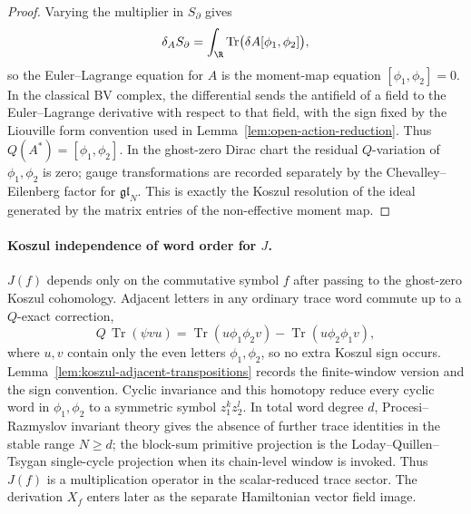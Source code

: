 \documentclass[11pt]{memoir}
\begin{document}
\begin{proof}
  Varying the multiplier in \(S_\partial\) gives
  \[
    \delta_A S_\partial
      =
      \int_\R\operatorname{Tr}\bigl(\delta A[\phi_1,\phi_2]\bigr),
  \]
  so the Euler--Lagrange equation for \(A\) is the moment-map equation
  \([\phi_1,\phi_2]=0\).  In the classical BV complex, the differential
  sends the antifield of a field to the Euler--Lagrange derivative with
  respect to that field, with the sign fixed by the Liouville form
  convention used in Lemma~\ref{lem:open-action-reduction}.  Thus
  \(Q(A^*)=[\phi_1,\phi_2]\).  In the ghost-zero Dirac chart the
  residual \(Q\)-variation of \(\phi_1,\phi_2\) is zero; gauge
  transformations are recorded separately by the
  Chevalley--Eilenberg factor for \(\mathfrak{gl}_N\).  This is exactly
  the Koszul resolution of the ideal generated by the matrix entries of
  the non-effective moment map.
\end{proof}

\paragraph{\texorpdfstring{Koszul independence of word order for \(J\).}{Koszul independence of word order for J}}
\(J(f)\) depends only on the commutative symbol \(f\) after passing to
the ghost-zero Koszul cohomology.  Adjacent letters in any ordinary
trace word commute up to a \(Q\)-exact correction,
\[
  Q\,\operatorname{Tr}(\psi vu)
  =
  \operatorname{Tr}(u\phi_1\phi_2v)
  -\operatorname{Tr}(u\phi_2\phi_1v),
\]
where \(u,v\) contain only the even letters \(\phi_1,\phi_2\), so no
extra Koszul sign occurs.  Lemma~\ref{lem:koszul-adjacent-transpositions}
records the finite-window version and the sign convention.  Cyclic
invariance and this homotopy reduce every cyclic word in
\(\phi_1,\phi_2\) to a symmetric symbol \(z_1^kz_2^l\).  In total word
degree \(d\), Procesi--Razmyslov invariant theory gives the absence of
further trace identities in the stable range \(N\geq d\); the block-sum
primitive projection is the Loday--Quillen--Tsygan single-cycle
projection when its chain-level window is invoked.  Thus \(J(f)\) is a
multiplication operator in the scalar-reduced trace sector.  The
derivation \(X_f\) enters later as the separate Hamiltonian vector
field image.
\end{document}
